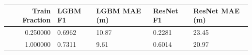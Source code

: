 \begin{tabular}{rllll}
\toprule
Train Fraction & LGBM F1 & LGBM MAE (m) & ResNet F1 & ResNet MAE (m) \\
\midrule
0.250000 & 0.6962 & 10.87 & 0.2281 & 23.45 \\
1.000000 & 0.7311 & 9.61 & 0.6014 & 20.97 \\
\bottomrule
\end{tabular}
